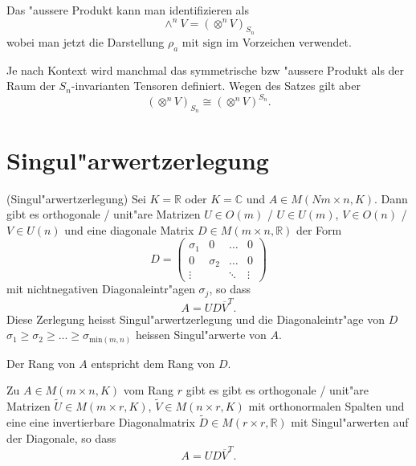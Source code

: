 \documentclass[11pt, a4paper]{article}
\begin{document}
\begin{remark}
Das "aussere Produkt kann man identifizieren als 
$$
\wedge^n V = (\otimes^nV)_{S_n}
$$
wobei man jetzt die Darstellung $\rho_a$ mit $\mathrm{sign}$ im Vorzeichen verwendet.
\end{remark}

\begin{remark}
Je nach Kontext wird manchmal das symmetrische bzw "aussere Produkt als der Raum der $S_n$-invarianten Tensoren definiert. Wegen des Satzes gilt aber
$$
(\otimes^n V)_{S_n} \cong (\otimes^n V)^{S_n}.
$$
\end{remark}

\section{Singul"arwertzerlegung}
\begin{definition} (Singul"arwertzerlegung) Sei $K = \mathbb{R}$ oder $K = \mathbb{C}$ und $A \in M(N m \times n, K)$. Dann gibt es orthogonale  / unit"are Matrizen $U \in O(m)$ / $U \in U(m)$, $V \in O(n)$ / $V \in U(n)$ und eine diagonale Matrix $D\in M(m \times n, \mathbb{R})$ der Form 
$$
D=\left(\begin{array}{cccc}\sigma_{1} & 0 & \dots & 0 \\ 0 & \sigma_{2} & \dots & 0 \\ \vdots & & \ddots & \vdots\end{array}\right)
$$
mit nichtnegativen Diagonaleintr"agen $\sigma_j$, so dass
$$
A = U D \overline{V}^T.
$$
Diese Zerlegung heisst Singul"arwertzerlegung und die Diagonaleintr"age von $D$ $\sigma_1 \geq \sigma_2 \geq ... \geq \sigma_{\mathrm{min}(m,n)}$ heissen Singul"arwerte von $A$.

\end{definition}

\begin{remark}
Der Rang von $A$ entspricht dem Rang von $D$.
\end{remark}


\begin{corollary}
Zu $A \in M(m \times n, K)$ vom Rang $r$ gibt es gibt es orthogonale  / unit"are Matrizen $\tilde{U} \in M(m \times r, K)$, $\tilde{V} \in M(n \times r, K)$ mit orthonormalen Spalten und eine eine invertierbare Diagonalmatrix $\tilde{D} \in M(r \times r, \mathbb{R})$ mit Singul"arwerten auf der Diagonale, so dass 
$$
A = U D \overline{V}^T.
$$
\end{corollary}
\end{document}
